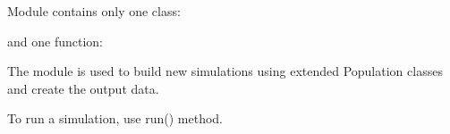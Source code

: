 \documentclass[letterpaper,10pt,english]{sphinxmanual}
\begin{document}
Module contains only one class:

\begin{sphinxVerbatim}[commandchars=\\\{\}]
\end{sphinxVerbatim}

and one function:

\begin{sphinxVerbatim}[commandchars=\\\{\}]
\end{sphinxVerbatim}

The module is used to build new simulations using
extended Population classes and create the output data.

To run a simulation, use run() method.
\end{document}
